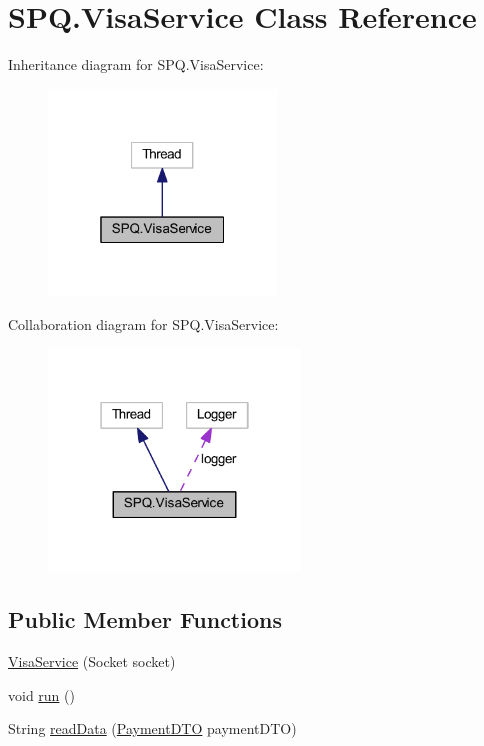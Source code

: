 \hypertarget{class_s_p_q_1_1_visa_service}{}\section{S\+P\+Q.\+Visa\+Service Class Reference}
\label{class_s_p_q_1_1_visa_service}


Inheritance diagram for S\+P\+Q.\+Visa\+Service\+:\nopagebreak
\begin{figure}[H]
\begin{center}
\leavevmode
\includegraphics[width=172pt]{class_s_p_q_1_1_visa_service__inherit__graph}
\end{center}
\end{figure}


Collaboration diagram for S\+P\+Q.\+Visa\+Service\+:\nopagebreak
\begin{figure}[H]
\begin{center}
\leavevmode
\includegraphics[width=190pt]{class_s_p_q_1_1_visa_service__coll__graph}
\end{center}
\end{figure}
\subsection*{Public Member Functions}
\begin{DoxyCompactItemize}
\item 
\mbox{\hyperlink{class_s_p_q_1_1_visa_service_a18a0c5b945cf8164f1069230db5ddc91}{Visa\+Service}} (Socket socket)
\item 
void \mbox{\hyperlink{class_s_p_q_1_1_visa_service_a4e9434dfb98d1ff247d29794ac96909e}{run}} ()
\item 
String \mbox{\hyperlink{class_s_p_q_1_1_visa_service_a9f06022375e8bd98b78a8268bdc4ff05}{read\+Data}} (\mbox{\hyperlink{class_s_p_q_1_1dto_1_1_payment_d_t_o}{Payment\+D\+TO}} payment\+D\+TO)
\end{DoxyCompactItemize}


